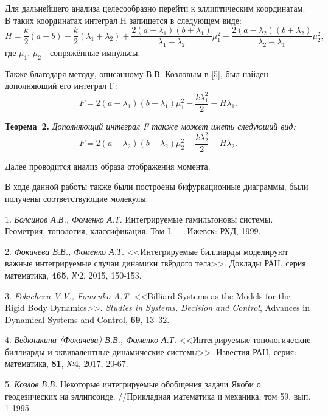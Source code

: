 Для дальнейшего анализа целесообразно перейти к эллиптическим координатам. В таких координатах интеграл H запишется в следующем виде:
$$H=\frac{k}{2}(a-b)-\frac{k}{2}(\lambda_1+\lambda_2)+\frac{2(a-\lambda_1)(b+\lambda_1)}{\lambda_1-\lambda_2}\mu_1^2+\frac{2(a-\lambda_2)(b+\lambda_2)}{\lambda_2-\lambda_1}\mu_2^2,$$
где $\mu_1$, $\mu_2$ - сопряжённые импульсы.

Также благодаря методу, описанному В.В. Козловым в [5], был найден дополняющий его интеграл F:
$$F=2(a-\lambda_1)(b+\lambda_1)\mu_1^2-\frac{k\lambda_1^2}{2}-H\lambda_1.$$

\textbf{Теорема~2.} {\it Дополняющий интеграл F также может иметь следующий вид:
$$F=2(a-\lambda_2)(b+\lambda_2)\mu_2^2-\frac{k\lambda_2^2}{2}-H\lambda_2.$$}

Далее проводится анализ образа отображения момента.

В ходе данной работы также были построены бифуркационные диаграммы, были получены соответствующие молекулы.

\litlist

1. {\it Болсинов А.В., Фоменко А.Т.} Интегрируемые гамильтоновы системы. Геометрия, топология, классификация. Том I. — Ижевск: РХД, 1999.

2. {\it Фокичева В.В., Фоменко А.Т.} <<Интегрируемые биллиарды моделируют важные интегрируемые случаи динамики твёрдого тела>>. Доклады РАН, серия: математика, {\bf 465}, №2, 2015, 150-153.

3. {\it Fokicheva V.V., Fomenko A.T.} <<Billiard Systems as the Models for the Rigid
Body Dynamics>>. {\it Studies in Systems, Decision and Control}, Advances in Dynamical
Systems and Control, {\bf 69}, 13–32.

4. {\it Ведюшкина (Фокичева) В.В., Фоменко А.Т.} <<Интегрируемые топологические биллиарды и эквивалентные динамические системы>>. Известия РАН, серия: математика, {\bf 81}, №4, 2017, 20-67.

5. {\it Козлов В.В.} Некоторые интегрируемые обобщения задачи Якоби о геодезических на эллипсоиде. //Прикладная математика и механика, том 59, вып. 1 1995.
